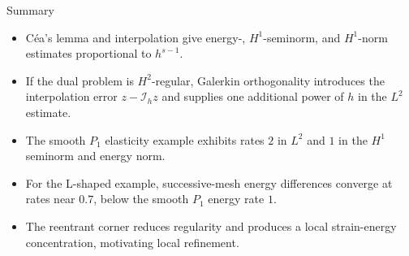 \documentclass[11pt,aspectratio=169]{beamer}
\newcommand{\Ih}{\mathcal I_h}
\begin{document}
\begin{frame}{Summary}
\begin{itemize}
  \item C\'ea's lemma and interpolation give energy-, $H^1$-seminorm, and
  $H^1$-norm estimates proportional to $h^{s-1}$.
  \item If the dual problem is $H^2$-regular, Galerkin orthogonality introduces
  the interpolation error $z-\Ih z$ and supplies one additional power of $h$
  in the $L^2$ estimate.
  \item The smooth $P_1$ elasticity example exhibits rates $2$ in $L^2$ and
  $1$ in the $H^1$ seminorm and energy norm.
  \item For the L-shaped example, successive-mesh energy differences converge
  at rates near $0.7$, below the smooth $P_1$ energy rate $1$.
  \item The reentrant corner reduces regularity and produces a local
  strain-energy concentration, motivating local refinement.
\end{itemize}
\end{frame}
\end{document}
